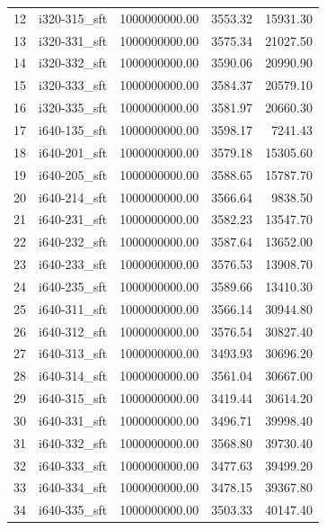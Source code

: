 \begin{tabular}{llrrr}
12 &  i320-315\_sft & 1000000000.00 &           3553.32 &    15931.30 \\
13 &  i320-331\_sft & 1000000000.00 &           3575.34 &    21027.50 \\
14 &  i320-332\_sft & 1000000000.00 &           3590.06 &    20990.90 \\
15 &  i320-333\_sft & 1000000000.00 &           3584.37 &    20579.10 \\
16 &  i320-335\_sft & 1000000000.00 &           3581.97 &    20660.30 \\
17 &  i640-135\_sft & 1000000000.00 &           3598.17 &     7241.43 \\
18 &  i640-201\_sft & 1000000000.00 &           3579.18 &    15305.60 \\
19 &  i640-205\_sft & 1000000000.00 &           3588.65 &    15787.70 \\
20 &  i640-214\_sft & 1000000000.00 &           3566.64 &     9838.50 \\
21 &  i640-231\_sft & 1000000000.00 &           3582.23 &    13547.70 \\
22 &  i640-232\_sft & 1000000000.00 &           3587.64 &    13652.00 \\
23 &  i640-233\_sft & 1000000000.00 &           3576.53 &    13908.70 \\
24 &  i640-235\_sft & 1000000000.00 &           3589.66 &    13410.30 \\
25 &  i640-311\_sft & 1000000000.00 &           3566.14 &    30944.80 \\
26 &  i640-312\_sft & 1000000000.00 &           3576.54 &    30827.40 \\
27 &  i640-313\_sft & 1000000000.00 &           3493.93 &    30696.20 \\
28 &  i640-314\_sft & 1000000000.00 &           3561.04 &    30667.00 \\
29 &  i640-315\_sft & 1000000000.00 &           3419.44 &    30614.20 \\
30 &  i640-331\_sft & 1000000000.00 &           3496.71 &    39998.40 \\
31 &  i640-332\_sft & 1000000000.00 &           3568.80 &    39730.40 \\
32 &  i640-333\_sft & 1000000000.00 &           3477.63 &    39499.20 \\
33 &  i640-334\_sft & 1000000000.00 &           3478.15 &    39367.80 \\
34 &  i640-335\_sft & 1000000000.00 &           3503.33 &    40147.40 \\
\bottomrule
\end{tabular}
